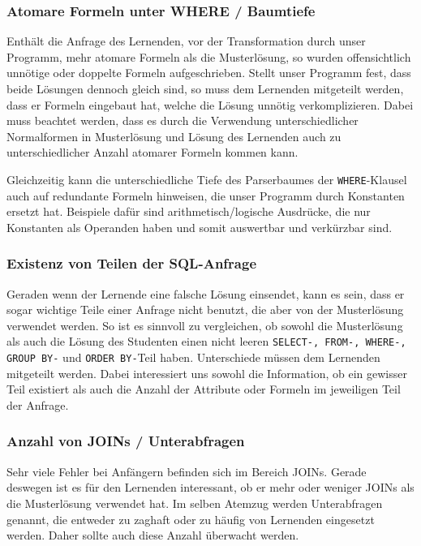 \subsubsection*{Atomare Formeln unter WHERE / Baumtiefe}

Enthält die Anfrage des Lernenden, vor der Transformation durch unser Programm, mehr atomare Formeln als die Musterlösung, so wurden offensichtlich unnötige oder doppelte Formeln aufgeschrieben. Stellt unser Programm fest, dass beide Lösungen dennoch gleich sind, so muss dem Lernenden mitgeteilt werden, dass er Formeln eingebaut hat, welche die Lösung unnötig verkomplizieren. Dabei muss beachtet werden, dass es durch die Verwendung unterschiedlicher Normalformen in Musterlösung und Lösung des Lernenden auch zu unterschiedlicher Anzahl atomarer Formeln kommen kann.

Gleichzeitig kann die unterschiedliche Tiefe des Parserbaumes der \verb|WHERE|-Klausel auch auf redundante Formeln hinweisen, die unser Programm durch Konstanten ersetzt hat. Beispiele dafür sind arithmetisch/logische Ausdrücke, die nur Konstanten als Operanden haben und somit auswertbar und verkürzbar sind.

\subsubsection*{Existenz von Teilen der SQL-Anfrage}

Geraden wenn der Lernende eine falsche Lösung einsendet, kann es sein, dass er sogar wichtige Teile einer Anfrage nicht benutzt, die aber von der Musterlösung verwendet werden. So ist es sinnvoll zu vergleichen, ob sowohl die Musterlösung als auch die Lösung des Studenten einen nicht leeren \verb|SELECT-, FROM-, WHERE-, GROUP BY-| und \verb|ORDER BY-|Teil haben. Unterschiede müssen dem Lernenden mitgeteilt werden. Dabei interessiert uns sowohl die Information, ob ein gewisser Teil existiert als auch die Anzahl der Attribute oder Formeln im jeweiligen Teil der Anfrage.

\subsubsection*{Anzahl von JOINs / Unterabfragen}

Sehr viele Fehler bei Anfängern befinden sich im Bereich JOINs. Gerade deswegen ist es für den Lernenden interessant, ob er mehr oder weniger JOINs als die Musterlösung verwendet hat. Im selben Atemzug werden Unterabfragen genannt, die entweder zu zaghaft oder zu häufig von Lernenden eingesetzt werden. Daher sollte auch diese Anzahl überwacht werden.

